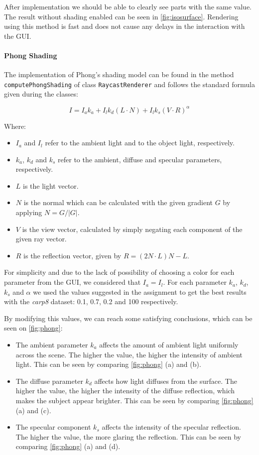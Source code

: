 \documentclass[a4paper]{article}
\begin{document}
After implementation we should be able to clearly see parts with the same value. The result without shading enabled can be seen in \autoref{fig:isosurface}. Rendering using this method is fast and does not cause any delays in the interaction with the GUI.

\paragraph{Phong Shading}

The implementation of Phong's shading model can be found in the method {\tt computePhongShading} of class {\tt RaycastRenderer} and follows the standard formula given during the classes:

$$ I = I_a k_a + I_lk_d(L \cdot N)+I_l k_s (V \cdot R)^\alpha$$

Where:
\begin{itemize}[noitemsep]
  \item $I_a$ and $I_l$ refer to the ambient light and to the object light, respectively.
  \item $k_a$, $k_d$ and $k_s$ refer to the ambient, diffuse and specular parameters, respectively.
  \item $L$ is the light vector.
  \item $N$ is the normal which can be calculated with the given gradient $G$ by applying $N= {G}/{|G|}$.
  \item $V$ is the view vector, calculated by simply negating each component of the given ray vector.
  \item $R$ is the reflection vector, given by $R = (2N \cdot L)N-L$.
\end{itemize}

For simplicity and due to the lack of possibility of choosing a color for each parameter from the GUI, we considered that $I_a=I_l$. For each parameter $k_a$, $k_d$, $k_s$ and $\alpha$ we used the values suggested in the assignment to get the best results with the \textit{carp8} dataset: 0.1, 0.7, 0.2 and 100 respectively.

By modifying this values, we can reach some satisfying conclusions, which can be seen on \autoref{fig:phong}:
\begin{itemize}[noitemsep]
  \item The ambient parameter $k_a$ affects the amount of ambient light uniformly across the scene. The higher the value, the higher the intensity of ambient light. This can be seen by comparing \autoref{fig:phong} (a) and (b).
  \item The diffuse parameter $k_d$ affects how light diffuses from the surface. The higher the value, the higher the intensity of the diffuse reflection, which makes the subject appear brighter. This can be seen by comparing \autoref{fig:phong} (a) and (c).
  \item The specular component $k_s$ affects the intensity of the specular reflection. The higher the value, the more glaring the reflection. This can be seen by comparing \autoref{fig:phong} (a) and (d).
\end{itemize}
\end{document}
